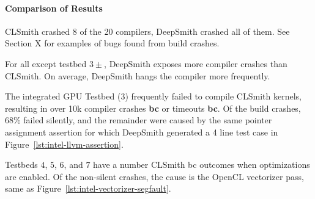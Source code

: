 \paragraph{Comparison of Results}

CLSmith crashed 8 of the 20 compilers, DeepSmith crashed all of them. See Section X for examples of bugs found from build crashes.

For all except testbed $3\pm$, DeepSmith exposes more compiler crashes than CLSmith. On average, DeepSmith hangs the compiler more frequently. \cc{\ldots}

The integrated GPU Testbed (3) frequently failed to compile CLSmith kernels, resulting in over 10k compiler crashes \textbf{bc} or timeouts \textbf{bc}.
Of the build crashes, 68\% failed silently, and the remainder were caused by the same pointer assignment assertion for which DeepSmith generated a 4 line test case in Figure~\ref{lst:intel-llvm-assertion}. 

Testbeds $4$, $5$, $6$, and $7$ have a number CLSmith bc outcomes when optimizations are enabled. Of the non-silent crashes, the cause is the OpenCL vectorizer pass, same as Figure~\ref{lst:intel-vectorizer-segfault}.



